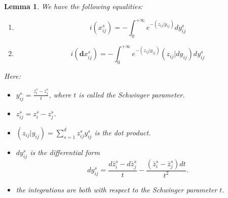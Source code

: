 \documentclass[11pt]{amsart}
\newtheorem{lem}[thm]{Lemma}
\theoremstyle{definition}
\theoremstyle{remark}
\numberwithin{equation}{section}
\begin{document}
\begin{lem}
    We have the following equalities:
    \begin{enumerate}
        \item
        $$
        i(x_{ij}^{s})=-\int_{0}^{+\infty}e^{-(z_{ij}|y_{ij})}dy_{ij}^{s}
        $$
        \item
        $$
        i(\mathbf{d}x_{ij}^{s})=-\int_{0}^{+\infty}e^{-(z_{ij}|y_{ij})}(z_{ij}|dy_{ij})dy_{ij}^{s}
        $$
    \end{enumerate}
    Here:
        \begin{itemize}
            \item $y_{ij}^{s}=\frac{\bar{z}_{i}^{s}-\bar{z}_{j}^{s}}{t}$, where $t$ is called the Schwinger parameter.
            \item $z_{ij}^{s}=z_{i}^{s}-z_{j}^{s}$.
            \item
            $(z_{ij}| y_{ij})=\sum\limits_{s=1}^{d}z_{ij}^{s}y_{ij}^{s}$ is the dot product.
            \item $dy_{ij}^{s}$ is the differential form
            $$
            dy_{ij}^{s}=\frac{d\bar{z}_{i}^{s}-d\bar{z}_{j}^{s}}{t}-\frac{(\bar{z}_{i}^{s}-\bar{z}_{j}^{s})dt}{t^{2}}.
            $$
            \item the integrations are both with respect to the Schwinger parameter $t$.
        \end{itemize}
\end{lem}
\end{document}
